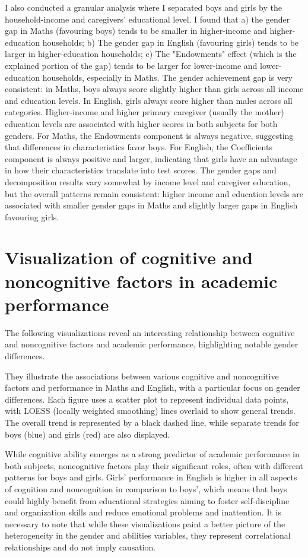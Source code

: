 \documentclass[12pt,a4paper,onecolumn]{article}
\numberwithin{equation}{section}
\begin{document}
I also conducted a granular analysis where I separated boys and girls by the household-income and caregivers' educational level. I found that a) the gender gap in Maths (favouring boys) tends to be smaller in higher-income and higher-education households; b) The gender gap in English (favouring girls) tends to be larger in higher-education households; c) The "Endowments" effect (which is the explained portion of the gap) tends to be larger for lower-income and lower-education households, especially in Maths. The gender achievement gap is very consistent: in Maths, boys always score slightly higher than girls across all income and education levels. In English, girls always score higher than males across all categories. Higher-income and higher primary caregiver (usually the mother) education levels are associated with higher scores in both subjects for both genders. For Maths, the Endowments component is always negative, suggesting that differences in characteristics favor boys. For English, the Coefficients component is always positive and larger, indicating that girls have an advantage in how their characteristics translate into test scores. The gender gaps and decomposition results vary somewhat by income level and caregiver education, but the overall patterns remain consistent: higher income and education levels are associated with smaller gender gaps in Maths and slightly larger gaps in English favouring girls.


\section{Visualization of cognitive and noncognitive factors in academic performance}

The following visualizations reveal an interesting relationship between cognitive and noncognitive factors and academic performance, highlighting notable gender differences. 

They illustrate the associations between various cognitive and noncognitive factors and performance in Maths and English, with a particular focus on gender differences. Each figure uses a scatter plot to represent individual data points, with LOESS (locally weighted smoothing) lines overlaid to show general trends. The overall trend is represented by a black dashed line, while separate trends for boys (blue) and girls (red) are also displayed.

While cognitive ability emerges as a strong predictor of academic performance in both subjects, noncognitive factors play their significant roles, often with different patterns for boys and girls. Girls' performance in English is higher in all aspects of cognition and noncognition in comparison to boys', which means that boys could highly benefit from educational strategies aiming to foster self-discipline and organization skills and reduce emotional problems and inattention. It is necessary to note that while these visualizations paint a better picture of the heterogeneity in the gender and abilities variables, they represent correlational relationships and do not imply causation. 
\end{document}
